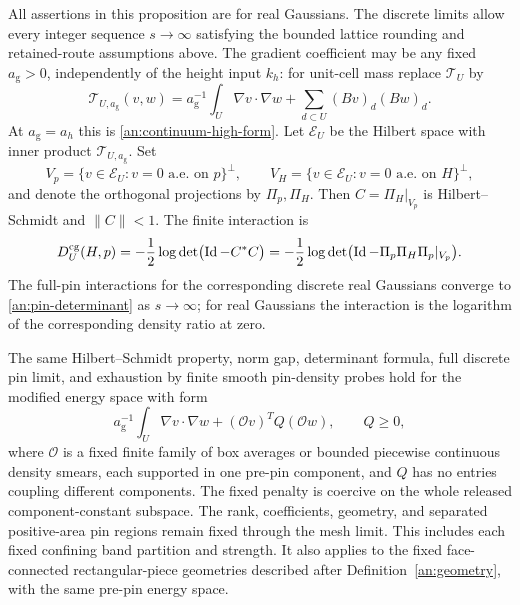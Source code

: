 \begin{proposition}
\label{an:gaussian-localization}
All assertions in this proposition are for real Gaussians.
The discrete limits allow every integer sequence $s\to\infty$
satisfying the bounded lattice rounding and retained-route assumptions
above.  The gradient coefficient may be any fixed
$a_{\mathrm g}>0$, independently of the height input $k_h$:
for unit-cell mass replace $\mathcal T_U$ by
\[
 \mathcal T_{U,a_{\mathrm g}}(v,w)
 =a_{\mathrm g}^{-1}\int_U\nabla v\cdot\nabla w
       +\sum_{d\subset U}(Bv)_d(Bw)_d .
\]
At $a_{\mathrm g}=a_h$ this is \eqref{an:continuum-high-form}.
Let $\mathcal E_U$ be the Hilbert space with inner product
$\mathcal T_{U,a_{\mathrm g}}$.  Set
\[
 V_p=\{v\in\mathcal E_U:v=0\text{ a.e. on }p\}^{\perp},
 \qquad V_H=\{v\in\mathcal E_U:v=0\text{ a.e. on }H\}^{\perp},
\]
and denote the orthogonal projections by $\Pi_p,\Pi_H$.
Then $C=\Pi_H|_{V_p}$ is Hilbert--Schmidt and $\|C\|<1$.
The finite interaction is
\begin{equation}
 D_U^{\mathrm{cg}}(H,p)
   =-\frac12\log\det\bigl(\operatorname{Id}-C^*C\bigr)
   =-\frac12\log\det\bigl(\operatorname{Id}-\Pi_p\Pi_H\Pi_p|_{V_p}\bigr).
 \label{an:pin-determinant}
\end{equation}
The full-pin interactions for the corresponding discrete
real Gaussians converge to \eqref{an:pin-determinant} as
$s\to\infty$; for real Gaussians the interaction is the logarithm
of the corresponding density ratio at zero.

The same Hilbert--Schmidt property, norm gap, determinant formula,
full discrete pin limit, and exhaustion by finite smooth pin-density
probes hold for the modified energy space with form
\[
 a_{\mathrm g}^{-1}\int_U\nabla v\cdot\nabla w
       +(\mathcal Ov)^TQ(\mathcal Ow),\qquad Q\ge0,
\]
where $\mathcal O$ is a fixed finite family of box averages or bounded
piecewise continuous density smears, each supported in one pre-pin
component, and $Q$ has no entries coupling different components.
The fixed penalty is coercive on the whole released component-constant
subspace.  The rank, coefficients, geometry, and separated positive-area
pin regions remain fixed through the mesh limit.  This includes each
fixed confining band partition and strength.  It also applies to the
fixed face-connected rectangular-piece geometries described after
Definition~\ref{an:geometry}, with the same pre-pin energy space.


\end{proposition}
